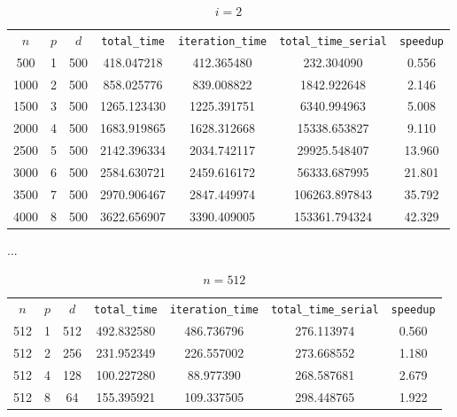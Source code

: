 \documentclass[
ngerman,
subtask=ruled %
]{tudaexercise}
\begin{document}
\begin{table}[htbp]
	\centering
	\caption{$i=2$}
	\begin{tabular}{ccccccc}
		
		$n$ & $p$ & $d$ & \texttt{total\_time} & \texttt{iteration\_time} & \texttt{total\_time\_serial} & \texttt{speedup} \\ 
		500 & 1   & 500 & 418.047218           & 412.365480              & 232.304090                 & 0.556            \\
		1000 & 2  & 500 & 858.025776           & 839.008822              & 1842.922648                & 2.146            \\
		1500 & 3  & 500 & 1265.123430          & 1225.391751             & 6340.994963                & 5.008            \\
		2000 & 4  & 500 & 1683.919865          & 1628.312668             & 15338.653827               & 9.110            \\
		2500 & 5  & 500 & 2142.396334          & 2034.742117             & 29925.548407               & 13.960           \\
		3000 & 6  & 500 & 2584.630721          & 2459.616172             & 56333.687995               & 21.801           \\
		3500 & 7  & 500 & 2970.906467          & 2847.449974             & 106263.897843              & 35.792           \\
		4000 & 8  & 500 & 3622.656907          & 3390.409005             & 153361.794324              & 42.329           \\
	\end{tabular}
\end{table}

...


\begin{table}[htbp]
	\centering
	\caption{$n=512$}
	
	\begin{tabular}{ccccccc}
		$n$ & $p$ & $d$ & \texttt{total\_time} & \texttt{iteration\_time} & \texttt{total\_time\_serial} & \texttt{speedup} \\
		512 & 1   & 512 & 492.832580           & 486.736796              & 276.113974                 & 0.560            \\
		512 & 2   & 256 & 231.952349           & 226.557002              & 273.668552                 & 1.180            \\
		512 & 4   & 128 & 100.227280           & 88.977390               & 268.587681                 & 2.679            \\
		512 & 8   & 64  & 155.395921           & 109.337505              & 298.448765                 & 1.922            \\
	\end{tabular}
\end{table}
	
	
\end{document}
